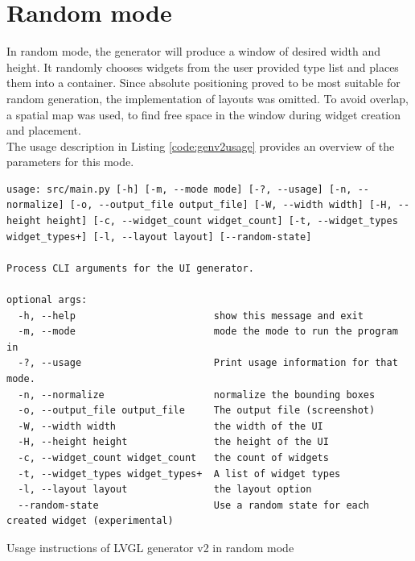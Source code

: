 \documentclass[Bachelor, BIC, english, fhCitStyle, IEEE]{BASE/twbook} %
\begin{document}
\section{Random mode}
In random mode, the generator will produce a window of desired width and height. It randomly chooses widgets from the user provided type list and places them into a container. Since absolute positioning proved to be most suitable for random generation, the implementation of layouts was omitted. To avoid overlap, a spatial map was used, to find free space in the window during widget creation and placement.\\
The usage description in Listing \ref{code:genv2usage} provides an overview of the parameters for this mode.
\begin{listing}[htbp]
    \begin{verbatim}
usage: src/main.py [-h] [-m, --mode mode] [-?, --usage] [-n, --normalize] [-o, --output_file output_file] [-W, --width width] [-H, --height height] [-c, --widget_count widget_count] [-t, --widget_types widget_types+] [-l, --layout layout] [--random-state]

Process CLI arguments for the UI generator.

optional args:
  -h, --help                        show this message and exit
  -m, --mode                        mode the mode to run the program in
  -?, --usage                       Print usage information for that mode.
  -n, --normalize                   normalize the bounding boxes
  -o, --output_file output_file     The output file (screenshot)
  -W, --width width                 the width of the UI
  -H, --height height               the height of the UI
  -c, --widget_count widget_count   the count of widgets
  -t, --widget_types widget_types+  A list of widget types
  -l, --layout layout               the layout option
  --random-state                    Use a random state for each created widget (experimental)
    \end{verbatim}
    \caption{Usage instructions of LVGL generator v2 in random mode}
    \label{code:genv2usage}
\end{listing}
\end{document}
